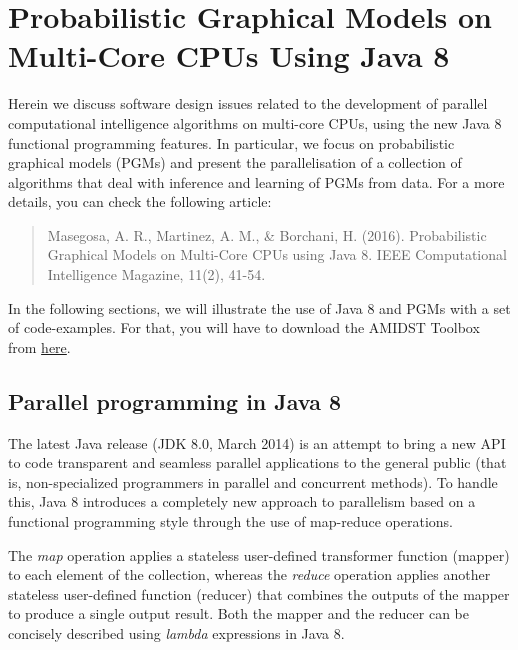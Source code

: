 \documentclass[10pt,a4paper]{article}
\begin{document}
\section{Probabilistic Graphical Models on Multi-Core CPUs Using Java 8}\label{sec:blog:multicore}

Herein we discuss software design issues related to the development of parallel computational intelligence algorithms on multi-core CPUs, using the new Java 8 functional programming features. In particular, we focus on probabilistic graphical models (PGMs) and present the parallelisation of a collection of algorithms that deal with inference and learning of PGMs from data. For a more details, you can check the following article:

\begin{quotation}
Masegosa, A. R., Martinez, A. M., \& Borchani, H. (2016). Probabilistic Graphical Models on Multi-Core CPUs using Java 8. IEEE Computational Intelligence Magazine, 11(2), 41-54.
\end{quotation}

In the following sections, we will illustrate the use of Java 8 and PGMs with a set of code-examples. For that, you will have to download the AMIDST Toolbox from \href{http://www.amidsttoolbox.com/documentation/0-5-2/first-steps-052/getting-started-052/}{here}. 

\subsection{Parallel programming in Java 8}\label{sec:blog:multicore:java8}

The latest Java release (JDK 8.0, March 2014) is an attempt to bring a new API to code transparent and seamless parallel applications to the general public (that is, non-specialized programmers in parallel and concurrent methods). To handle this, Java 8 introduces a completely new approach to parallelism based on a functional programming style through the use of map-reduce operations. \newline

The \textit{map} operation applies a stateless user-defined transformer function (mapper) to each element of the collection, whereas the \textit{reduce} operation applies another stateless user-defined function (reducer) that combines the outputs of the mapper to produce a single output result. Both the mapper and the reducer can be concisely described using \textit{lambda} expressions in Java 8.\newline
\end{document}
